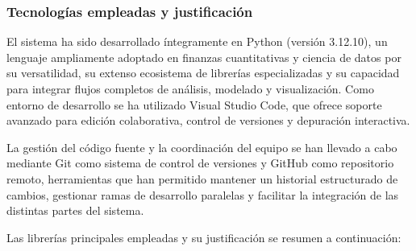 \documentclass[
]{article}
\begin{document}
\subsubsection{Tecnologías empleadas y justificación}

El sistema ha sido desarrollado íntegramente en Python 
(versión 3.12.10), un lenguaje ampliamente adoptado en finanzas 
cuantitativas y ciencia de datos por su versatilidad, su extenso 
ecosistema de librerías especializadas y su capacidad para integrar 
flujos completos de análisis, modelado y visualización. Como entorno 
de desarrollo se ha utilizado Visual Studio Code, que ofrece soporte 
avanzado para edición colaborativa, control de versiones y depuración 
interactiva.

La gestión del código fuente y la coordinación del equipo se han 
llevado a cabo mediante Git como sistema de control de versiones y 
GitHub como repositorio remoto, herramientas que han permitido 
mantener un historial estructurado de cambios, gestionar ramas de 
desarrollo paralelas y facilitar la integración de las distintas 
partes del sistema.

Las librerías principales empleadas y su justificación se resumen a 
continuación:
\end{document}
